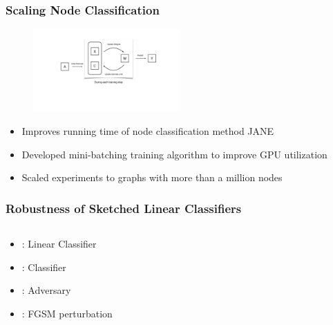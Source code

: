 \documentclass[pdf]{beamer}
\begin{document}


\begin{frame}
    \frametitle{Scaling Node Classification \cite{merchant2022JANE}}
    \begin{figure}
        \centering
        \includegraphics[width=0.5\textwidth]{figs/JANE.pdf}
    \end{figure}
    \begin{itemize}
        \item Improves running time of node classification method JANE \cite{merchant2022JANEorig}
        \item Developed mini-batching training algorithm to improve GPU utilization
        \item Scaled experiments to graphs with more than a million nodes
    \end{itemize}

\end{frame}
    

\begin{frame}
    \frametitle{Robustness of Sketched Linear Classifiers \cite{mahadevan2022certifiable}}
    \begin{columns}
        \begin{column}{0.4\textwidth}
           \begin{itemize}
            \item \w: Linear Classifier
            \item \z: \wmsketch Classifier \cite{tai2018sketch}
            \item \adv: Adversary
            \item \perturb: FGSM perturbation
           \end{itemize}
        \end{column}
        \begin{column}{0.6\textwidth}
            \begin{center}
                \scalebox{0.85}{
                \begin{tikzpicture}
                    
                    
                  \end{tikzpicture}
                }
             \end{center}
        \end{column}
        \end{columns}

\end{frame}
\end{document}
